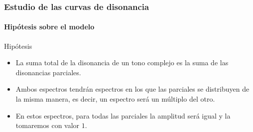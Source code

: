 \documentclass[12 pt]{beamer}
\begin{document}
\begin{frame}{19}
    \frametitle{Estudio de las curvas de disonancia}
    
    \framesubtitle{Hipótesis sobre el modelo}
        
    \begin{block}{Hipótesis}
        \begin{itemize}
            \item La suma total de la disonancia de un tono complejo es la suma de las disonancias parciales.
            \item Ambos espectros tendrán espectros en los que las parciales se distribuyen de la misma manera, es decir, un espectro será un múltiplo del otro.
            \item En estos espectros, para todas las parciales la amplitud será igual y la tomaremos con valor $1$.        
        \end{itemize}
    \end{block}
    
\end{frame}
\end{document}
